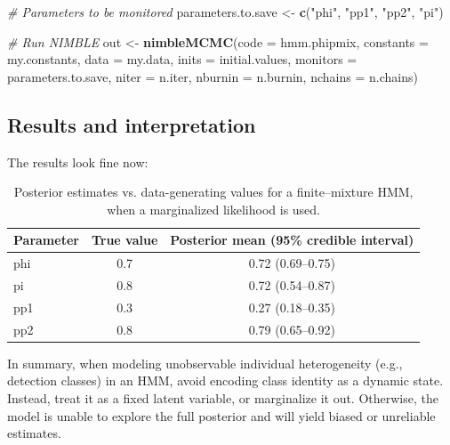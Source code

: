 \documentclass[
  12pt,
]{krantz}
\newenvironment{Shaded}{\begin{snugshade}}{\end{snugshade}}
\newcommand{\AttributeTok}[1]{\textcolor[rgb]{0.13,0.29,0.53}{#1}}
\newcommand{\CommentTok}[1]{\textcolor[rgb]{0.56,0.35,0.01}{\textit{#1}}}
\newcommand{\FunctionTok}[1]{\textcolor[rgb]{0.13,0.29,0.53}{\textbf{#1}}}
\newcommand{\NormalTok}[1]{#1}
\newcommand{\OtherTok}[1]{\textcolor[rgb]{0.56,0.35,0.01}{#1}}
\newcommand{\StringTok}[1]{\textcolor[rgb]{0.31,0.60,0.02}{#1}}
\begin{document}
\begin{Shaded}
\begin{Highlighting}[]
\CommentTok{\# Parameters to be monitored}
\NormalTok{parameters.to.save }\OtherTok{\textless{}{-}} \FunctionTok{c}\NormalTok{(}\StringTok{"phi"}\NormalTok{, }\StringTok{"pp1"}\NormalTok{, }\StringTok{"pp2"}\NormalTok{, }\StringTok{"pi"}\NormalTok{)}

\CommentTok{\# Run NIMBLE}
\NormalTok{out }\OtherTok{\textless{}{-}} \FunctionTok{nimbleMCMC}\NormalTok{(}\AttributeTok{code =}\NormalTok{ hmm.phipmix, }
                  \AttributeTok{constants =}\NormalTok{ my.constants,}
                  \AttributeTok{data =}\NormalTok{ my.data,              }
                  \AttributeTok{inits =}\NormalTok{ initial.values,}
                  \AttributeTok{monitors =}\NormalTok{ parameters.to.save,}
                  \AttributeTok{niter =}\NormalTok{ n.iter,}
                  \AttributeTok{nburnin =}\NormalTok{ n.burnin, }
                  \AttributeTok{nchains =}\NormalTok{ n.chains)}
\end{Highlighting}
\end{Shaded}

\subsection{Results and interpretation}\label{results-and-interpretation-5}

The results look fine now:

\begin{table}

\caption{\label{tab:unnamed-chunk-396}Posterior estimates vs. data-generating values for a finite--mixture HMM, when a marginalized likelihood is used.}
\centering
\begin{tabular}[t]{l|c|c}
\hline
Parameter & True value & Posterior mean (95\% credible interval)\\
\hline
phi & 0.7 & 0.72 (0.69–0.75)\\
\hline
pi & 0.8 & 0.72 (0.54–0.87)\\
\hline
pp1 & 0.3 & 0.27 (0.18–0.35)\\
\hline
pp2 & 0.8 & 0.79 (0.65–0.92)\\
\hline
\end{tabular}
\end{table}

In summary, when modeling unobservable individual heterogeneity (e.g., detection classes) in an HMM, avoid encoding class identity as a dynamic state. Instead, treat it as a fixed latent variable, or marginalize it out. Otherwise, the model is unable to explore the full posterior and will yield biased or unreliable estimates.
\end{document}
